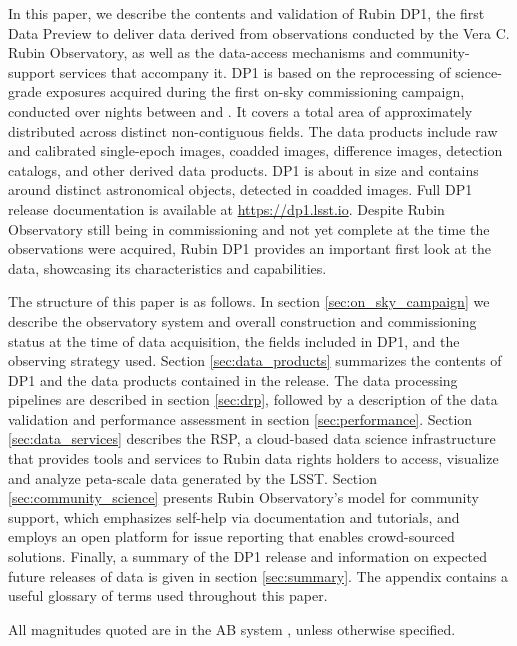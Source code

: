 In this paper, we describe the contents and validation of Rubin \gls{DP1}, the first Data Preview to deliver data derived from observations conducted by the Vera C. Rubin Observatory, as well as the data-access mechanisms and community-support services that accompany it. 
\gls{DP1} is based on the reprocessing of \nexposures science-grade exposures acquired during the first on-sky commissioning campaign, conducted over \nnightscomcam nights between \campaignstartdate and \dponeenddate.
It covers a  total area of approximately \totalarea distributed across \nfields distinct non-contiguous fields.
The data products include raw and calibrated single-\gls{epoch} images, coadded images, difference images, detection catalogs, and other derived data products.
\gls{DP1} is about \sizeinbytes in size and contains around \nobjects distinct astronomical objects, detected in \ndeepcoadds coadded images.
Full \gls{DP1} release documentation is available at \url{https://dp1.lsst.io}.
Despite Rubin Observatory still being in commissioning and not yet complete at the time the observations were acquired, Rubin \gls{DP1} provides an important first look at the data, showcasing its characteristics and capabilities.

The structure of this paper is as follows.
In section \ref{sec:on_sky_campaign} we describe the observatory system and overall construction and commissioning status at the time of data acquisition, the \nfields fields included in \gls{DP1}, and the observing strategy used.
Section \ref{sec:data_products} summarizes the contents of \gls{DP1} and the data products contained in the release.
The data processing pipelines are described in section \ref{sec:drp}, followed by a description of the data validation and performance assessment in section \ref{sec:performance}.
Section \ref{sec:data_services} describes the \gls{RSP}, a \gls{cloud}-based data science infrastructure that provides tools and services to Rubin data rights holders to access, visualize and analyze peta-scale data generated by the \gls{LSST}.
Section \ref{sec:community_science} presents Rubin Observatory's model for community support, which emphasizes self-help via documentation and tutorials, and employs an open platform for issue reporting that enables crowd-sourced solutions.
Finally, a summary of the \gls{DP1} release and information on expected future releases of data is given in section \ref{sec:summary}.
The appendix contains a useful glossary of terms used throughout this paper.

All magnitudes quoted are in the AB system \citep{1983ApJ...266..713O}, unless otherwise specified.